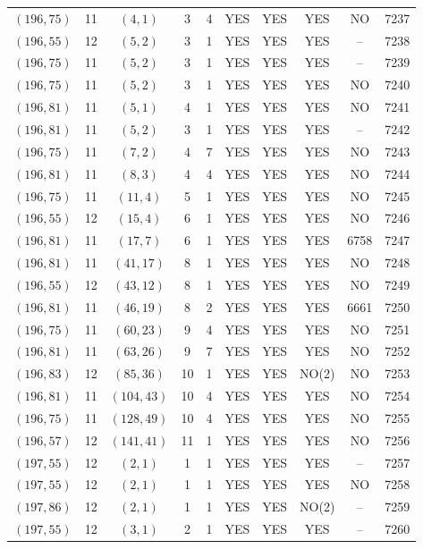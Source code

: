 \begin{longtable}{|c|c|c|c|c|c|c|c|c|c|}
$(196, 75)$ & 11 & $(4, 1)$ & 3 & 4 & YES & YES & YES & NO & 7237\\
$(196, 55)$ & 12 & $(5, 2)$ & 3 & 1 & YES & YES & YES & -- & 7238\\
$(196, 75)$ & 11 & $(5, 2)$ & 3 & 1 & YES & YES & YES & -- & 7239\\
$(196, 75)$ & 11 & $(5, 2)$ & 3 & 1 & YES & YES & YES & NO & 7240\\
$(196, 81)$ & 11 & $(5, 1)$ & 4 & 1 & YES & YES & YES & NO & 7241\\
$(196, 81)$ & 11 & $(5, 2)$ & 3 & 1 & YES & YES & YES & -- & 7242\\
$(196, 75)$ & 11 & $(7, 2)$ & 4 & 7 & YES & YES & YES & NO & 7243\\
$(196, 81)$ & 11 & $(8, 3)$ & 4 & 4 & YES & YES & YES & NO & 7244\\
$(196, 75)$ & 11 & $(11, 4)$ & 5 & 1 & YES & YES & YES & NO & 7245\\
$(196, 55)$ & 12 & $(15, 4)$ & 6 & 1 & YES & YES & YES & NO & 7246\\
$(196, 81)$ & 11 & $(17, 7)$ & 6 & 1 & YES & YES & YES & 6758 & 7247\\
$(196, 81)$ & 11 & $(41, 17)$ & 8 & 1 & YES & YES & YES & NO & 7248\\
$(196, 55)$ & 12 & $(43, 12)$ & 8 & 1 & YES & YES & YES & NO & 7249\\
$(196, 81)$ & 11 & $(46, 19)$ & 8 & 2 & YES & YES & YES & 6661 & 7250\\
$(196, 75)$ & 11 & $(60, 23)$ & 9 & 4 & YES & YES & YES & NO & 7251\\
$(196, 81)$ & 11 & $(63, 26)$ & 9 & 7 & YES & YES & YES & NO & 7252\\
$(196, 83)$ & 12 & $(85, 36)$ & 10 & 1 & YES & YES & NO(2) & NO & 7253\\
$(196, 81)$ & 11 & $(104, 43)$ & 10 & 4 & YES & YES & YES & NO & 7254\\
$(196, 75)$ & 11 & $(128, 49)$ & 10 & 4 & YES & YES & YES & NO & 7255\\
$(196, 57)$ & 12 & $(141, 41)$ & 11 & 1 & YES & YES & YES & NO & 7256\\
$(197, 55)$ & 12 & $(2, 1)$ & 1 & 1 & YES & YES & YES & -- & 7257\\
$(197, 55)$ & 12 & $(2, 1)$ & 1 & 1 & YES & YES & YES & NO & 7258\\
$(197, 86)$ & 12 & $(2, 1)$ & 1 & 1 & YES & YES & NO(2) & -- & 7259\\
$(197, 55)$ & 12 & $(3, 1)$ & 2 & 1 & YES & YES & YES & -- & 7260\\

\end{longtable}
